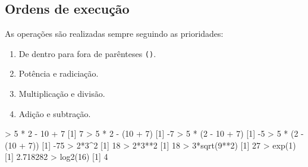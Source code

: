 \documentclass[
  10pt,
  a4paper]{book}
\newenvironment{Shaded}{\begin{snugshade}}{\end{snugshade}}
\newcommand{\DecValTok}[1]{\textcolor[rgb]{0.00,0.00,0.81}{#1}}
\newcommand{\FloatTok}[1]{\textcolor[rgb]{0.00,0.00,0.81}{#1}}
\newcommand{\FunctionTok}[1]{\textcolor[rgb]{0.00,0.00,0.00}{#1}}
\newcommand{\NormalTok}[1]{#1}
\newcommand{\SpecialCharTok}[1]{\textcolor[rgb]{0.00,0.00,0.00}{#1}}
\providecommand{\tightlist}{%
  \setlength{\itemsep}{0pt}\setlength{\parskip}{0pt}}
\begin{document}
\hypertarget{ordens-de-execuuxe7uxe3o}{%
\subsection{Ordens de execução}\label{ordens-de-execuuxe7uxe3o}}

As operações são realizadas sempre seguindo as prioridades:

\begin{enumerate}
\def\labelenumi{\arabic{enumi}.}
\tightlist
\item
  De dentro para fora de parênteses \texttt{()}.
\item
  Potência e radiciação.
\item
  Multiplicação e divisão.
\item
  Adição e subtração.
\end{enumerate}

\begin{Shaded}
\begin{Highlighting}[]
\SpecialCharTok{\textgreater{}} \DecValTok{5} \SpecialCharTok{*} \DecValTok{2} \SpecialCharTok{{-}} \DecValTok{10} \SpecialCharTok{+} \DecValTok{7}
\NormalTok{[}\DecValTok{1}\NormalTok{] }\DecValTok{7}
\SpecialCharTok{\textgreater{}} \DecValTok{5} \SpecialCharTok{*} \DecValTok{2} \SpecialCharTok{{-}}\NormalTok{ (}\DecValTok{10} \SpecialCharTok{+} \DecValTok{7}\NormalTok{)}
\NormalTok{[}\DecValTok{1}\NormalTok{] }\SpecialCharTok{{-}}\DecValTok{7}
\SpecialCharTok{\textgreater{}} \DecValTok{5} \SpecialCharTok{*}\NormalTok{ (}\DecValTok{2} \SpecialCharTok{{-}} \DecValTok{10} \SpecialCharTok{+} \DecValTok{7}\NormalTok{)}
\NormalTok{[}\DecValTok{1}\NormalTok{] }\SpecialCharTok{{-}}\DecValTok{5}
\SpecialCharTok{\textgreater{}} \DecValTok{5} \SpecialCharTok{*}\NormalTok{ (}\DecValTok{2} \SpecialCharTok{{-}}\NormalTok{ (}\DecValTok{10} \SpecialCharTok{+} \DecValTok{7}\NormalTok{))}
\NormalTok{[}\DecValTok{1}\NormalTok{] }\SpecialCharTok{{-}}\DecValTok{75}
\SpecialCharTok{\textgreater{}} \DecValTok{2}\SpecialCharTok{*}\DecValTok{3}\SpecialCharTok{\^{}}\DecValTok{2}
\NormalTok{[}\DecValTok{1}\NormalTok{] }\DecValTok{18}
\SpecialCharTok{\textgreater{}} \DecValTok{2}\SpecialCharTok{*}\DecValTok{3}\SpecialCharTok{**}\DecValTok{2}
\NormalTok{[}\DecValTok{1}\NormalTok{] }\DecValTok{18}
\SpecialCharTok{\textgreater{}} \DecValTok{3}\SpecialCharTok{*}\FunctionTok{sqrt}\NormalTok{(}\DecValTok{9}\SpecialCharTok{**}\DecValTok{2}\NormalTok{)}
\NormalTok{[}\DecValTok{1}\NormalTok{] }\DecValTok{27}
\SpecialCharTok{\textgreater{}} \FunctionTok{exp}\NormalTok{(}\DecValTok{1}\NormalTok{)}
\NormalTok{[}\DecValTok{1}\NormalTok{] }\FloatTok{2.718282}
\SpecialCharTok{\textgreater{}} \FunctionTok{log2}\NormalTok{(}\DecValTok{16}\NormalTok{)}
\NormalTok{[}\DecValTok{1}\NormalTok{] }\DecValTok{4}
\end{Highlighting}
\end{Shaded}
\end{document}
